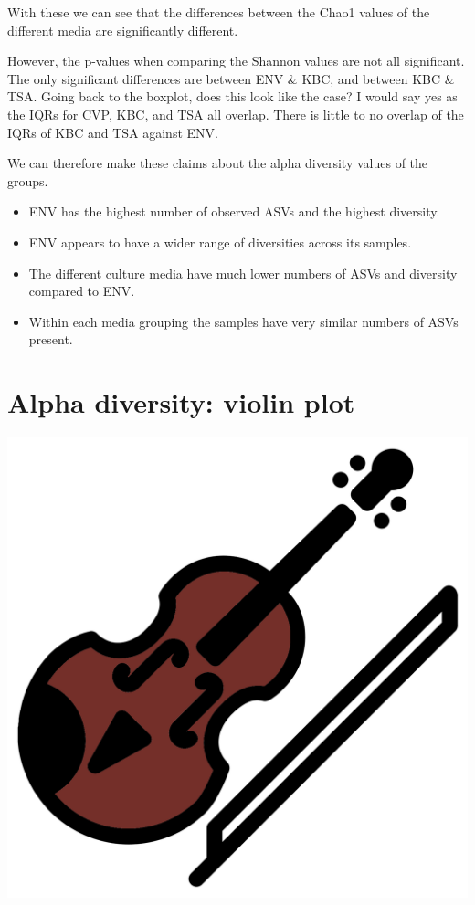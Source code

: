 \documentclass[
]{book}
\providecommand{\tightlist}{%
  \setlength{\itemsep}{0pt}\setlength{\parskip}{0pt}}
\begin{document}
With these we can see that the differences between the Chao1 values of the different media are significantly different.

However, the p-values when comparing the Shannon values are not all significant.
The only significant differences are between ENV \& KBC, and between KBC \& TSA.
Going back to the boxplot, does this look like the case?
I would say yes as the IQRs for CVP, KBC, and TSA all overlap.
There is little to no overlap of the IQRs of KBC and TSA against ENV.

We can therefore make these claims about the alpha diversity values of the groups.

\begin{itemize}
\tightlist
\item
  ENV has the highest number of observed ASVs and the highest diversity.
\item
  ENV appears to have a wider range of diversities across its samples.
\item
  The different culture media have much lower numbers of ASVs and diversity compared to ENV.
\item
  Within each media grouping the samples have very similar numbers of ASVs present.
\end{itemize}

\hypertarget{alpha-diversity-violin-plot}{%
\section{Alpha diversity: violin plot}\label{alpha-diversity-violin-plot}}

\includegraphics{figures/violin.png}
\end{document}
